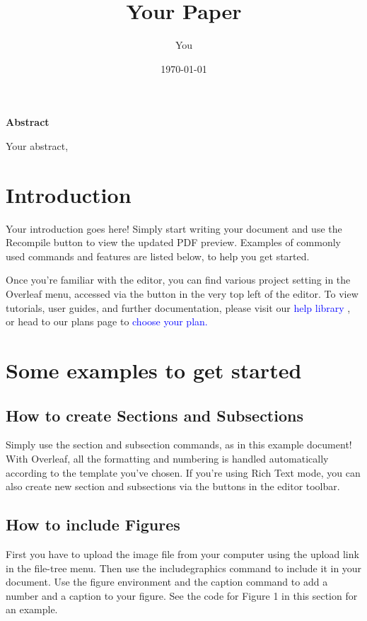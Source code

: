 \documentclass{article}
\title {Your Paper}
\author{You}
\date{\today}
\begin{document}
\maketitle
\hspace{6cm}
\textbf{Abstract}

\hspace{0.8cm} Your abstract,
			\section{Introduction}
	Your introduction goes here! Simply start writing your document and use the Recompile button to
	view the updated PDF preview. Examples of commonly used commands and features are listed below,
	to help you get started.
   	 
   	  Once you’re familiar with the editor, you can find various project setting in the Overleaf menu,
	accessed via the button in the very top left of the editor. To view tutorials, user guides, and further
	documentation, please visit our 
	\textcolor{blue}{help library}
	, or head to our plans page to 
	\textcolor{blue}{choose your plan.}
	\section{Some examples to get started}
	\subsection{How to create Sections and Subsections}
	Simply use the section and subsection commands, as in this example document! With Overleaf, all
	the formatting and numbering is handled automatically according to the template you’ve chosen. If
	you’re using Rich Text mode, you can also create new section and subsections via the buttons in the
	editor toolbar.
	\subsection{How to include Figures}
	First you have to upload the image file from your computer using the upload link in the file-tree menu.
	Then use the includegraphics command to include it in your document. Use the figure environment
	and the caption command to add a number and a caption to your figure. See the code for Figure 1 in
	this section for an example.
	
\end{document}
